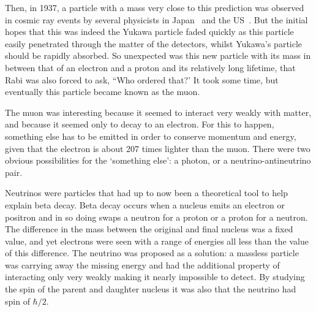 \FigTheoryMuonDecayCloudChamber
Then, in 1937, a particle with a mass very close to this prediction was observed in cosmic ray events by several physicists in Japan~\cite{Nishina193712} and the US~\cite{Neddermeyer1937md,Street193711}.
But the initial hopes that this was indeed the Yukawa particle faded quickly as this particle easily penetrated through the matter of the detectors, whilst Yukawa's particle should be rapidly absorbed.
So unexpected was this new particle with its mass in between that of an electron and a proton and its relatively long lifetime, that Rabi was also forced to ask, ``Who ordered that?'
It took some time, but eventually this particle became known as the muon.

The muon was interesting because it seemed to interact very weakly with matter, and because it seemed only to decay to an electron.
For this to happen, something else has to be emitted in order to conserve momentum and energy, given that the electron is about 207 times lighter than the muon.
There were two obvious possibilities for the `something else': a photon, or a neutrino-antineutrino pair.

Neutrinos were particles that had up to now been a theoretical tool to help explain beta decay.
Beta decay occurs when a nucleus emits an electron or positron and in so doing swaps a neutron for a proton or a proton for a neutron.
The difference in the mass between the original and final nucleus was a fixed value, and yet electrons were seen with a range of energies all less than the value of this difference.
The neutrino was proposed as a solution: a massless particle was carrying away the missing energy and had the additional property of interacting only very weakly making it nearly impossible to detect.
By studying the spin of the parent and daughter nucleus it was also that the neutrino had spin of $\hbar/2$.


